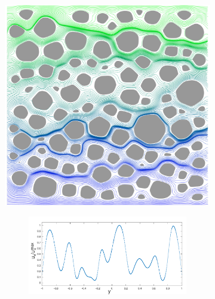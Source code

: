 \documentclass[preprint, 10pt]{elsarticle}
\begin{document}

\begin{figure}[H]
\begin{subfigure}[b]{0.5\textwidth}
\includegraphics[width = \textwidth]{./figs/100b_t100tracer}
\caption{}
\end{subfigure}
\begin{subfigure}[b]{0.45\textwidth}
\begin{subfigure}[b]{\textwidth}
\includegraphics*[width =\linewidth]{./figs/velocity_loc100}

\end{subfigure}
\end{subfigure}
\end{figure}
\end{document}

